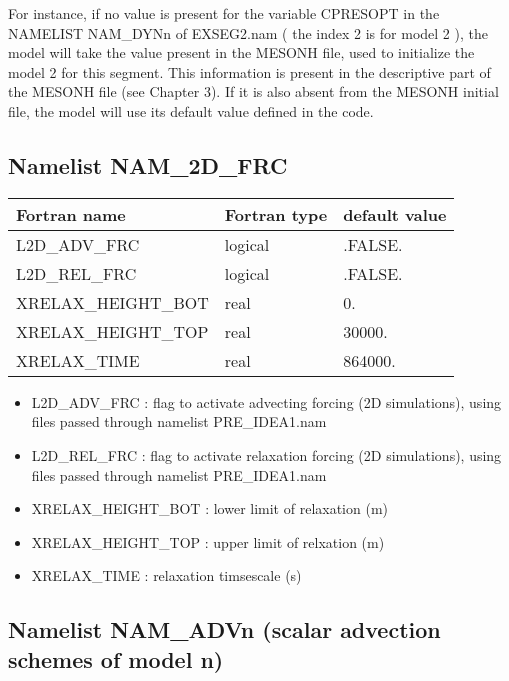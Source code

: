  For instance, if no
value is present for the variable CPRESOPT in the NAMELIST NAM\_DYNn of 
EXSEG2.nam ( the index 2 is for model 2 ), the
model will take the value present in the MESONH file, used to initialize the
model 2 for this segment. This information is present in the descriptive part of
the MESONH file (see Chapter 3). If it is also absent from the MESONH
initial file, the model will use its default value defined in the  
code.\\


\subsection{Namelist NAM\_2D\_FRC}

\begin{center}
\begin{tabular} {|l|l|l|}
\hline
Fortran name & Fortran type & default value \\
\hline
L2D\_ADV\_FRC   &  logical  & .FALSE.   \\
L2D\_REL\_FRC   &  logical  & .FALSE.   \\
XRELAX\_HEIGHT\_BOT & real & 0.\\
XRELAX\_HEIGHT\_TOP & real & 30000.\\
XRELAX\_TIME & real & 864000.\\

\hline
\end{tabular}
\end{center}
\begin{itemize}
\item L2D\_ADV\_FRC : flag to activate advecting forcing (2D simulations),
 using files passed through namelist PRE\_IDEA1.nam
\item L2D\_REL\_FRC : flag to activate relaxation forcing (2D simulations), 
using files passed through namelist PRE\_IDEA1.nam
\item XRELAX\_HEIGHT\_BOT : lower limit of relaxation (m)
\item XRELAX\_HEIGHT\_TOP : upper limit of relxation (m)
\item XRELAX\_TIME : relaxation timsescale (s)
\end{itemize}
\subsection{Namelist NAM\_ADVn (scalar advection schemes of model n)}
\label{ss:withn}

